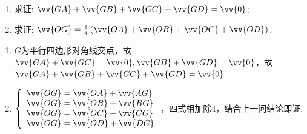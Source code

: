 \begin{enumerate}
    \begin{enumerate}[(1)]
    \item 求证: $\vv{GA}+\vv{GB}+\vv{GC}+\vv{GD}=\vv{0}$; 
    \item 求证: $\vv{OG}=\frac{1}{4}\left(\vv{OA}+\vv{OB}+\vv{OC}+\vv{OD}\right)$.
    \end{enumerate}
    \begin{jieda}
        \begin{enumerate}
            \item $G$为平行四边形对角线交点，故$\vv{GA} + \vv{GC} = \vv{0}, \vv{GB} + \vv{GD} = \vv{0}$，故$\vv{GA}+\vv{GB}+\vv{GC}+\vv{GD}=\vv{0}$
            \item $\left \{ \begin{array}{l}
                 \vv{OG} = \vv{OA} + \vv{AG}  \\
                 \vv{OG} = \vv{OB} + \vv{BG} \\
                 \vv{OG} = \vv{OC} + \vv{CG} \\
                 \vv{OG} = \vv{OD} + \vv{DG}
            \end{array} \right. $，四式相加除4，结合上一问结论即证.
        \end{enumerate}
    \end{jieda}
\end{enumerate}
\clearpage
